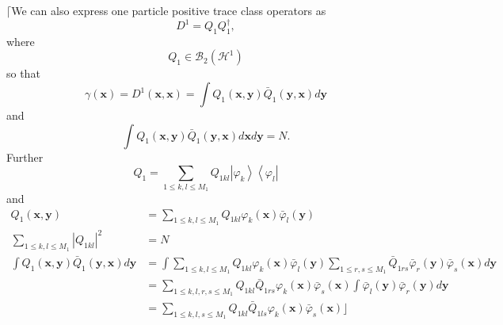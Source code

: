 \documentclass[aps,preprint]{revtex4}%
\begin{document}
$\lceil$We can also express one particle positive trace class operators as
\begin{equation}
D^{1}=Q_{1}Q_{1}^{\dagger},
\end{equation}
where
\begin{equation}
Q_{1}\in\mathcal{B}_{2}\left(  \mathcal{H}^{1}\right)
\end{equation}
so that
\begin{equation}
\gamma\left(  \mathbf{x}\right)  =D^{1}\left(  \mathbf{x,x}\right)  =\int
Q_{1}\left(  \mathbf{x,y}\right)  \bar{Q}_{1}\left(  \mathbf{y,x}\right)
d\mathbf{y}%
\end{equation}
and
\begin{equation}
\int Q_{1}\left(  \mathbf{x,y}\right)  \bar{Q}_{1}\left(  \mathbf{y,x}\right)
d\mathbf{x}d\mathbf{y}=N\mathbf{.}%
\end{equation}
Further
\begin{equation}
Q_{1}=\sum_{1\leq k,l\leq M_{1}}Q_{1kl}\left\vert \varphi_{k}\right\rangle
\left\langle \varphi_{l}\right\vert
\end{equation}
and
\begin{align}
Q_{1}\left(  \mathbf{x,y}\right)   &  =\sum_{1\leq k,l\leq M_{1}}%
Q_{1kl}\varphi_{k}\left(  \mathbf{x}\right)  \bar{\varphi}_{l}\left(
\mathbf{y}\right) \\
\sum_{1\leq k,l\leq M_{1}}\left\vert Q_{1kl}\right\vert ^{2}  &  =N\nonumber\\
\int Q_{1}\left(  \mathbf{x,y}\right)  \bar{Q}_{1}\left(  \mathbf{y,x}\right)
d\mathbf{y}  &  \mathbf{=}\int\sum_{1\leq k,l\leq M_{1}}Q_{1kl}\varphi
_{k}\left(  \mathbf{x}\right)  \bar{\varphi}_{l}\left(  \mathbf{y}\right)
\sum_{1\leq r,s\leq M_{1}}\bar{Q}_{1rs}\bar{\varphi}_{r}\left(  \mathbf{y}%
\right)  \bar{\varphi}_{s}\left(  \mathbf{x}\right)  d\mathbf{y}\\
&  =\sum_{1\leq k,l,r,s\leq M_{1}}Q_{1kl}\bar{Q}_{1rs}\varphi_{k}\left(
\mathbf{x}\right)  \bar{\varphi}_{s}\left(  \mathbf{x}\right)  \int
\bar{\varphi}_{l}\left(  \mathbf{y}\right)  \bar{\varphi}_{r}\left(
\mathbf{y}\right)  d\mathbf{y}\\
&  =\sum_{1\leq k,l,s\leq M_{1}}Q_{1kl}\bar{Q}_{1ls}\varphi_{k}\left(
\mathbf{x}\right)  \bar{\varphi}_{s}\left(  \mathbf{x}\right)  \rfloor
\end{align}
\end{document}
